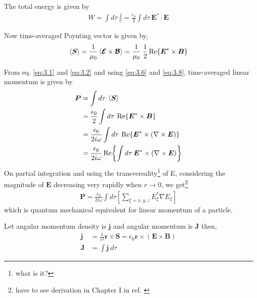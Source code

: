 \documentclass[11pt,a4paper]{article}
\numberwithin{equation}{section}
\begin{document}
The total energy is given by
\begin{align}
	W = \int d\tau\: \frac{I}{c}=\frac{\epsilon_0}{2}\int d\tau\: \boldsymbol{E}^\ast\cdot\boldsymbol{E}
\end{align}

Now time-averaged Poynting vector is given by, \cite{poynting}\cite{haus}
\begin{align}
	\expval{\boldsymbol{S}} =\frac{1}{\mu_0}\expval{\boldsymbol{\mathcal{E}} \times \boldsymbol{\mathcal{B}}} =\frac{1}{\mu_0}\; \frac{1}{2} \Re{\boldsymbol{E}^\ast \times \boldsymbol{B}} \label{eq:3.8}
\end{align}

From eq. \ref{eq:3.1} and \ref{eq:3.2} and using \ref{eq:3.6} and \ref{eq:3.8}, time-averaged linear momentum is given by
\begin{align}
	\boldsymbol{P} &= \int d\tau\: \expval{\boldsymbol{S}}\\
	&=\frac{\epsilon_0}{2}\int d\tau \:\Re{\boldsymbol{E}^\ast \times \boldsymbol{B}}\nonumber\\
	&= \frac{\epsilon_0}{2i\omega}\int d\tau\: \Re{\boldsymbol{E}^\ast \times (\nabla\times\boldsymbol{E})} \nonumber\\
	&= \frac{\epsilon_0}{2i\omega}\Re{\int d\tau\: {\boldsymbol{E}^\ast \times (\nabla\times\boldsymbol{E})}}
\end{align}
On partial integration and using the transversality\footnote{what is it?} of E, considering the magnitude of $\boldsymbol{E}$ decreasing very rapidly when $r\to0$, \cite{enk nien 92} we get\footnote{have to see derivation in Chapter I in ref. \cite{CCT}}
\begin{align}
	\boldsymbol{P}= \frac{\epsilon_0}{2i\omega}\int d\tau \left[\sum_{\xi=x,y,z}E_\xi^\ast\nabla E_\xi\right]
\end{align}
which is quantum mechanical equivalent for linear momentum of a particle.


Let angular momentum density is $\boldsymbol{j}$ and angular momentum is $\boldsymbol{J}$ then,
\begin{align}
	\boldsymbol{j} &= \frac{1}{c^2}\boldsymbol{r}\times\boldsymbol{S} = \epsilon_0 \boldsymbol{r}\times(\boldsymbol{E} \times \boldsymbol{B})\label{eq:3.12}\\
	\boldsymbol{J} &= \int \boldsymbol{j} \:d\tau\label{eq:3.13}
\end{align}
\end{document}
